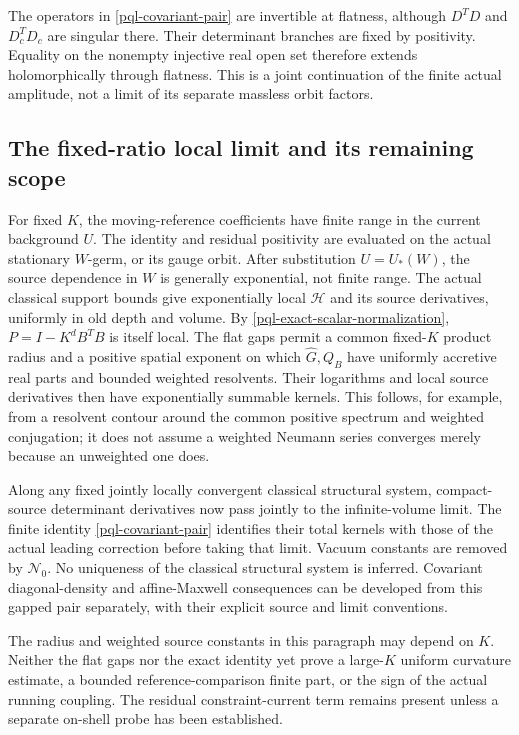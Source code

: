 The operators in \eqref{pql-covariant-pair} are invertible at
flatness, although $D^TD$ and $D_c^TD_c$ are singular there.
Their determinant branches are fixed by positivity. Equality on the
nonempty injective real open set therefore extends holomorphically
through flatness. This is a joint continuation of the finite actual
amplitude, not a limit of its separate massless orbit factors.

\subsection{The fixed-ratio local limit and its remaining scope}
\label{pql-fixed-ratio}

For fixed $K$, the moving-reference coefficients have finite range in the current background $U$. The identity and residual positivity are evaluated on the actual stationary $W$-germ, or its gauge orbit. After substitution $U=U_*(W)$, the source dependence in $W$ is generally exponential, not finite range.
The actual classical support bounds give exponentially local
$\mathcal H$ and its source derivatives, uniformly in old depth and
volume. By \eqref{pql-exact-scalar-normalization},
$P=I-K^dB^TB$ is itself local. The flat gaps permit a common
fixed-$K$ product radius and a positive spatial exponent on which
$\widehat G,Q_B$ have uniformly accretive real parts and bounded
weighted resolvents. Their logarithms and local source derivatives
then have exponentially summable kernels. This follows, for example,
from a resolvent contour around the common positive spectrum and
weighted conjugation; it does not assume a weighted Neumann series
converges merely because an unweighted one does.

Along any fixed jointly locally convergent classical structural
system, compact-source determinant derivatives now pass jointly to
the infinite-volume limit. The finite identity
\eqref{pql-covariant-pair} identifies their total kernels with those
of the actual leading correction before taking that limit. Vacuum
constants are removed by $\mathcal N_0$. No uniqueness of the
classical structural system is inferred. Covariant diagonal-density
and affine-Maxwell consequences can be developed from this gapped
pair separately, with their explicit source and limit conventions.

The radius and weighted source constants in this paragraph may depend
on $K$. Neither the flat gaps nor the exact identity yet prove a
large-$K$ uniform curvature estimate, a bounded reference-comparison
finite part, or the sign of the actual running coupling. The residual
constraint-current term remains present unless a separate on-shell
probe has been established.


